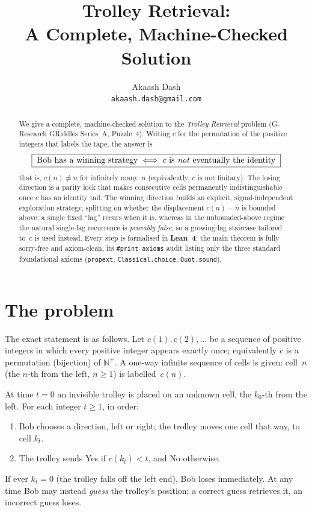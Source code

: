 \documentclass{article}
\title{Trolley Retrieval:\\
A Complete, Machine-Checked Solution}
\author{%
  Akaash Dash \\
  \texttt{akaash.dash@gmail.com}
}
\newcommand{\Np}{\mathbb{N}^{+}}
\newcommand{\Yes}{\textsf{Yes}}
\newcommand{\No}{\textsf{No}}
\newcommand{\lean}[1]{{\small\ttfamily #1}}
\begin{document}
\maketitle

\begin{abstract}
We give a complete, machine-checked solution to the \emph{Trolley
Retrieval} problem (G-Research GRiddles Series~A, Puzzle~4). Writing $c$
for the permutation of the positive integers that labels the tape, the
answer is
\[
  \boxed{\;\text{Bob has a winning strategy}\iff
  c\text{ is \emph{not} eventually the identity}\;}
\]
that is, $c(n)\neq n$ for infinitely many~$n$ (equivalently, $c$ is not
finitary). The losing direction is a parity lock that makes consecutive
cells permanently indistinguishable once $c$ has an identity tail. The
winning direction builds an explicit, signal-independent exploration
strategy, splitting on whether the displacement $c(n)-n$ is bounded
above: a single fixed ``lag'' recurs when it is, whereas in the
unbounded-above regime the natural single-lag recurrence is
\emph{provably false}, so a growing-lag staircase tailored to~$c$ is used
instead. Every step is formalised in \textbf{Lean~4}: the main theorem is
fully \lean{sorry}-free and axiom-clean, its \verb|#print axioms| audit
listing only the three standard foundational axioms (\verb|propext|,
\verb|Classical.choice|, \verb|Quot.sound|).
\end{abstract}

\section{The problem}\label{sec:problem}

The exact statement is as follows. Let $c(1), c(2), \dots$ be a sequence
of positive integers in which every positive integer appears exactly
once; equivalently $c$ is a permutation (bijection) of $\Np$. A one-way
infinite sequence of cells is given: cell~$n$ (the $n$-th from the left,
$n\ge 1$) is labelled~$c(n)$.

At time $t=0$ an invisible trolley is placed on an unknown cell, the
$k_0$-th from the left. For each integer $t\ge 1$, in order:
\begin{enumerate}[topsep=2pt,itemsep=1pt]
  \item Bob chooses a direction, left or right; the trolley moves one
  cell that way, to cell $k_t$.
  \item The trolley sends \Yes{} if $c(k_t) < t$, and \No{} otherwise.
\end{enumerate}
If ever $k_t = 0$ (the trolley falls off the left end), Bob loses
immediately. At any time Bob may instead \emph{guess} the trolley's
position; a correct guess retrieves it, an incorrect guess loses.
\end{document}
